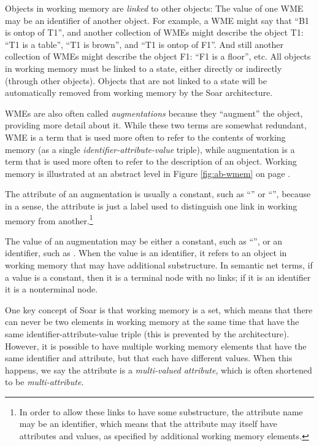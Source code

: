 Objects in working memory are \emph{linked} to other objects: The value of one WME may be an identifier of another object. For example, a WME might say that ``B1 is ontop of T1'', and another collection of WMEs might describe the object T1: ``T1 is a table'', ``T1 is brown'', and ``T1 is ontop of F1''. And still another collection of WMEs might describe the object F1: ``F1 is a floor'', etc. All objects in working memory must be linked to a state, either directly or indirectly (through other objects). Objects that are not linked to a state will be automatically removed from working memory by the Soar architecture.

WMEs are also often called \textit{augmentations} because they ``augment'' the object, providing more detail about it. While these two terms are somewhat redundant, WME is a term that is used more often to refer to the contents of working memory (as a single \textit{identifier-attribute-value} triple), while augmentation is a term that is used more often to refer to the description of an object. Working memory is illustrated at an abstract level in Figure \ref{fig:ab-wmem} on page \pageref{fig:ab-wmem}.

The attribute of an augmentation is usually a constant, such as ``'' or ``'', because in a sense, the attribute is just a label used to distinguish one link in working memory from another.\footnote{
	In order to allow these links to have some substructure, the attribute name may be an identifier, which means that the attribute may itself have attributes and values, as specified by additional working memory elements.
}

The value of an augmentation may be either a constant, such as ``'', or an identifier, such as . When the value is an identifier, it refers to an object in working memory that may have additional substructure. In semantic net terms, if a value is a constant, then it is a terminal node with no links; if it is an identifier it is a nonterminal node.

One key concept of Soar is that working memory is a set, which means that there can never be two elements in working memory at the same time that have the same identifier-attribute-value triple (this is prevented by the architecture). However, it is possible to have multiple working memory elements that have the same identifier and attribute, but that each have different values.  When this happens, we say the attribute is a \emph{multi-valued attribute}, which is often shortened to be \emph{multi-attribute}.

